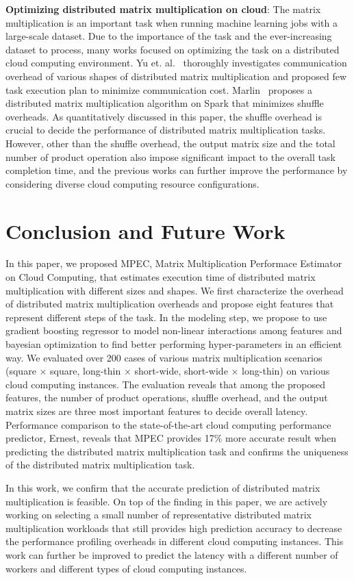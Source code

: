 \documentclass[10pt, conference, compsocconf]{IEEEtran}
\begin{document}
\textbf{Optimizing distributed matrix multiplication on cloud}: The matrix multiplication is an important task when running machine learning jobs with a large-scale dataset. Due to the importance of the task and the ever-increasing dataset to process, many works focused on optimizing the task on a distributed cloud computing environment. Yu et. al.~\cite{matmult-overhead-profiling} thoroughly investigates communication overhead of various shapes of distributed matrix multiplication and proposed few task execution plan to minimize communication cost. Marlin~\cite{marlin} proposes a distributed matrix multiplication algorithm on Spark that minimizes shuffle overheads. As quantitatively discussed in this paper, the shuffle overhead is crucial to decide the performance of distributed matrix multiplication tasks. However, other than the shuffle overhead, the output matrix size and the total number of product operation also impose significant impact to the overall task completion time, and the previous works can further improve the performance by considering diverse cloud computing resource configurations.

\section{Conclusion and Future Work}
In this paper, we proposed MPEC, Matrix Multiplication Performace Estimator on Cloud Computing, that estimates execution time of distributed matrix multiplication with different sizes and shapes. We first characterize the overhead of distributed matrix multiplication overheads and propose eight features that represent different steps of the task. In the modeling step, we propose to use gradient boosting regressor to model non-linear interactions among features and bayesian optimization to find better performing hyper-parameters in an efficient way. We evaluated over 200 cases of various matrix multiplication scenarios (square $\times$ square, long-thin $\times$ short-wide, short-wide $\times$ long-thin) on various cloud computing instances. The evaluation reveals that among the proposed features, the number of product operations, shuffle overhead, and the output matrix sizes are three most important features to decide overall latency. Performance comparison to the state-of-the-art cloud computing performance predictor, Ernest, reveals that MPEC provides 17\% more accurate result when predicting the distributed matrix multiplication task and confirms the uniqueness of the distributed matrix multiplication task.

In this work, we confirm that the accurate prediction of distributed matrix multiplication is feasible. On top of the finding in this paper, we are actively working on selecting a small number of representative distributed matrix multiplication workloads that still provides high prediction accuracy to decrease the performance profiling overheads in different cloud computing instances. This work can further be improved to predict the latency with a different number of workers and different types of cloud computing instances.


\end{document}
